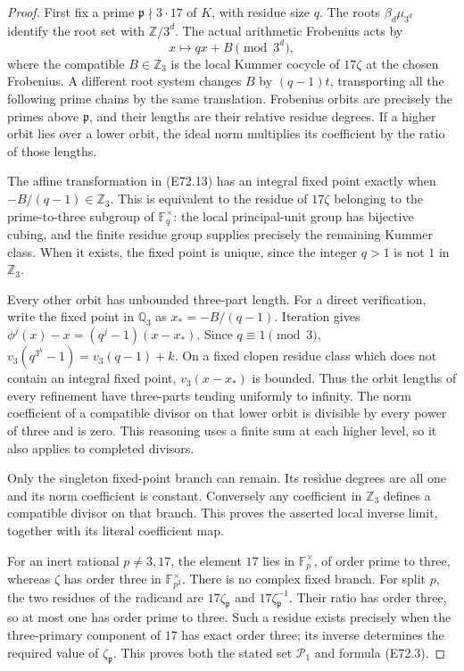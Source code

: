 \begin{proof}
First fix a prime $\mathfrak p\nmid3\cdot17$ of $K$, with residue
size $q$. The roots $\beta_d\mu_{3^d}$ identify the root set with
$\mathbb Z/3^d$. The actual arithmetic Frobenius acts by
\[
              x\longmapsto qx+B\pmod{3^d},
 \tag{E72.13}
\]
where the compatible $B\in\mathbb Z_3$ is the local Kummer
cocycle of $17\zeta$ at the chosen Frobenius. A different
root system changes $B$ by $(q-1)t$, transporting all the
following prime chains by the same translation.
Frobenius orbits are precisely the primes above $\mathfrak p$,
and their lengths are their relative residue degrees. If a
higher orbit lies over a lower orbit, the ideal norm multiplies
its coefficient by the ratio of those lengths.

The affine transformation in (E72.13) has an integral fixed
point exactly when $-B/(q-1)\in\mathbb Z_3$. This is equivalent
to the residue of $17\zeta$ belonging to the prime-to-three
subgroup of $\mathbb F_q^\times$: the local principal-unit
group has bijective cubing, and the finite residue group
supplies precisely the remaining Kummer class. When it
exists, the fixed point is unique, since the integer $q>1$
is not $1$ in $\mathbb Z_3$.

Every other orbit has unbounded three-part length. For a
direct verification, write the fixed point in $\mathbb Q_3$
as $x_*=-B/(q-1)$. Iteration gives
$\phi^j(x)-x=(q^j-1)(x-x_*)$. Since $q\equiv1\pmod3$,
$v_3(q^{3^k}-1)=v_3(q-1)+k$. On a fixed clopen residue
class which does not contain an integral fixed point,
$v_3(x-x_*)$ is bounded. Thus the orbit lengths of every
refinement have three-parts tending uniformly to infinity.
The norm coefficient of a compatible divisor on that lower
orbit is divisible by every power of three and is zero.
This reasoning uses a finite sum at each higher level,
so it also applies to completed divisors.

Only the singleton fixed-point branch can remain. Its residue
degrees are all one and its norm coefficient is constant.
Conversely any coefficient in $\mathbb Z_3$ defines a compatible
divisor on that branch. This proves the asserted local inverse
limit, together with its literal coefficient map.

For an inert rational $p\ne3,17$, the element $17$ lies in
$\mathbb F_p^\times$, of order prime to three, whereas
$\zeta$ has order three in $\mathbb F_{p^2}^\times$.
There is no complex fixed branch. For split $p$, the two
residues of the radicand are $17\zeta_{\mathfrak p}$ and
$17\zeta_{\mathfrak p}^{-1}$. Their ratio has order three,
so at most one has order prime to three. Such a residue
exists precisely when the three-primary component of $17$
has exact order three; its inverse determines the required
value of $\zeta_{\mathfrak p}$. This proves both the stated
set $\mathcal P_1$ and formula (E72.3).


\end{proof}
